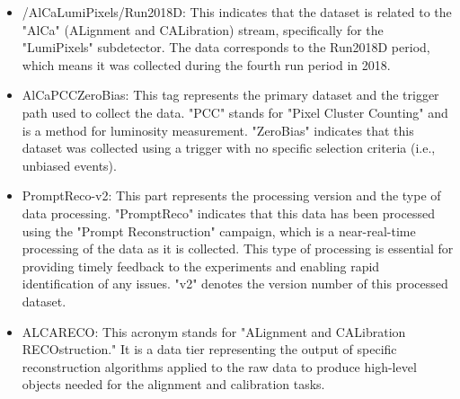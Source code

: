 \begin{itemize}

\item /AlCaLumiPixels/Run2018D:
This indicates that the dataset is related to the "AlCa" (ALignment and CALibration) stream, specifically for the "LumiPixels" subdetector. The data corresponds to the Run2018D period, which means it was collected during the fourth run period in 2018.

\item AlCaPCCZeroBias:
This tag represents the primary dataset and the trigger path used to collect the data. "PCC" stands for "Pixel Cluster Counting" and is a method for luminosity measurement. "ZeroBias" indicates that this dataset was collected using a trigger with no specific selection criteria (i.e., unbiased events).

\item PromptReco-v2:
This part represents the processing version and the type of data processing. "PromptReco" indicates that this data has been processed using the "Prompt Reconstruction" campaign, which is a near-real-time processing of the data as it is collected. This type of processing is essential for providing timely feedback to the experiments and enabling rapid identification of any issues. "v2" denotes the version number of this processed dataset.

\item ALCARECO:
This acronym stands for "ALignment and CALibration RECOstruction." It is a data tier representing the output of specific reconstruction algorithms applied to the raw data to produce high-level objects needed for the alignment and calibration tasks.

\end{itemize}































